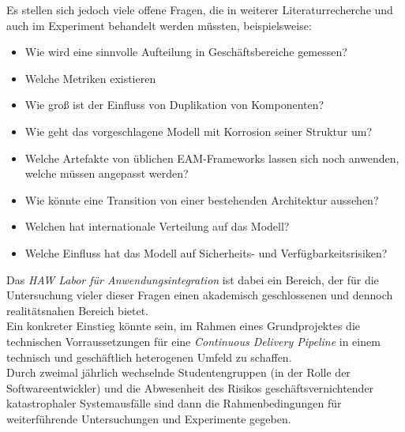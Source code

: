 \documentclass{llncs}
\begin{document}
Es stellen sich jedoch viele offene Fragen, die in weiterer Literaturrecherche und auch im Experiment behandelt werden müssten, beispielsweise:
\begin{itemize}
	\item Wie wird eine sinnvolle Aufteilung in Geschäftsbereiche gemessen?
	\item Welche Metriken existieren 
	\item Wie groß ist der Einfluss von Duplikation von Komponenten?
	\item Wie geht das vorgeschlagene Modell mit Korrosion seiner Struktur um?
	\item Welche Artefakte von üblichen EAM-Frameworks lassen sich noch anwenden, welche müssen angepasst werden?
	\item Wie könnte eine Transition von einer bestehenden Architektur aussehen?
	\item Welchen hat internationale Verteilung auf das Modell?
	\item Welche Einfluss hat das Modell auf Sicherheits- und Verfügbarkeitsrisiken?
\end{itemize}

Das \textit{HAW Labor für Anwendungsintegration} ist dabei ein Bereich, der für die Untersuchung vieler dieser Fragen einen akademisch geschlossenen und dennoch realitätsnahen Bereich bietet.\\

Ein konkreter Einstieg könnte sein, im Rahmen eines Grundprojektes die technischen Vorraussetzungen für eine \textit{Continuous Delivery Pipeline} in einem technisch und geschäftlich heterogenen Umfeld zu schaffen.\\

Durch zweimal jährlich wechselnde Studentengruppen (in der Rolle der Softwareentwickler) und die Abwesenheit des Risikos geschäftsvernichtender katastrophaler Systemausfälle sind dann die Rahmenbedingungen für weiterführende Untersuchungen und Experimente gegeben.

\cite{SeojinKim:2008:ACI:1642931.1642990}
\cite{clar:eke}

\end{document}
